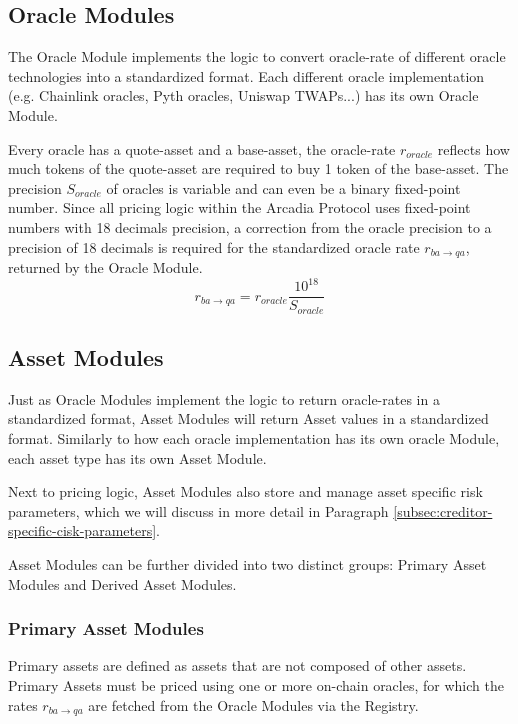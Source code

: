 \documentclass[sigconf,nonacm]{acmart}
\begin{document}
\subsection{Oracle Modules}
The Oracle Module implements the logic to convert oracle-rate of different oracle technologies into a standardized format.
Each different oracle implementation (e.g. Chainlink oracles, Pyth oracles, Uniswap TWAPs...) has its own Oracle Module.

Every oracle has a quote-asset and a base-asset, the oracle-rate $r_{oracle}$ reflects how much tokens of the quote-asset are required to buy 1 token of the base-asset.
The precision $S_{oracle}$ of oracles is variable and can even be a binary fixed-point number.
Since all pricing logic within the Arcadia Protocol uses fixed-point numbers with 18 decimals precision,
a correction from the oracle precision to a precision of 18 decimals is required for the standardized oracle rate $r_{ba\rightarrow qa}$, returned by the Oracle Module.
\begin{equation}
    \label{eq:oracle-module}
    r_{ba\rightarrow qa} = r_{oracle} \frac{10^{18}}{S_{oracle}}
\end{equation}

\subsection{Asset Modules}
Just as Oracle Modules implement the logic to return oracle-rates in a standardized format,
Asset Modules will return Asset values in a standardized format.
Similarly to how each oracle implementation has its own oracle Module, each asset type has its own Asset Module.

Next to pricing logic, Asset Modules also store and manage asset specific risk parameters, which we will discuss in more detail in Paragraph \ref{subsec:creditor-specific-cisk-parameters}.

Asset Modules can be further divided into two distinct groups: Primary Asset Modules and Derived Asset Modules.

\subsubsection{Primary Asset Modules}
Primary assets are defined as assets that are not composed of other assets.
Primary Assets must be priced using one or more on-chain oracles, for which the rates $r_{ba\rightarrow qa}$ are fetched from the Oracle Modules via the Registry.
\end{document}
